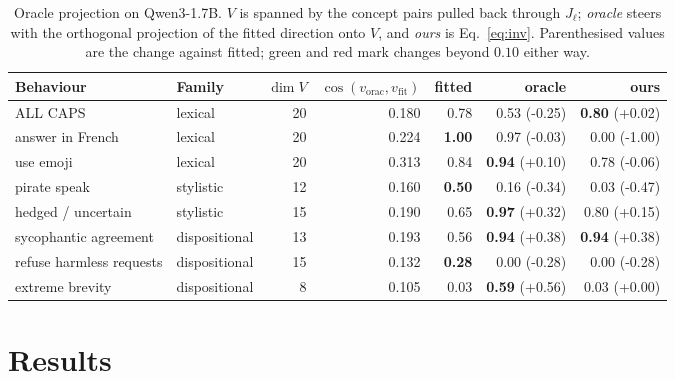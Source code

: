 \documentclass{article}
\newcommand{\pos}{\cellcolor{posgreen}}
\newcommand{\negc}{\cellcolor{negred}}
\newcommand{\dlt}[1]{{\scriptsize(#1)}}
\begin{document}
\begin{table}[t]
  \caption{Oracle projection on Qwen3-1.7B. $V$ is spanned by the concept pairs pulled back through $J_\ell$; \emph{oracle} steers with the orthogonal projection of the fitted direction onto $V$, and \emph{ours} is Eq.~\ref{eq:inv}. Parenthesised values are the change against fitted; \colorbox{posgreen}{green} and \colorbox{negred}{red} mark changes beyond $0.10$ either way.}
  \centering
  \small
  \begin{tabular}{llrrrrr}
    \toprule
    \textbf{Behaviour} & \textbf{Family} & $\dim V$ & $\cos(v_{\mathrm{orac}}, v_{\mathrm{fit}})$ & \textbf{fitted} & \textbf{oracle} & \textbf{ours} \\
    \midrule
    ALL CAPS                 & lexical       & 20 & 0.180 & 0.78          & \negc 0.53 \dlt{-0.25}          & \textbf{0.80} \dlt{+0.02} \\
    answer in French         & lexical       & 20 & 0.224 & \textbf{1.00} & 0.97 \dlt{-0.03}               & \negc 0.00 \dlt{-1.00} \\
    use emoji                & lexical       & 20 & 0.313 & 0.84          & \textbf{0.94} \dlt{+0.10}      & 0.78 \dlt{-0.06} \\
    pirate speak             & stylistic     & 12 & 0.160 & \textbf{0.50} & \negc 0.16 \dlt{-0.34}          & \negc 0.03 \dlt{-0.47} \\
    hedged / uncertain       & stylistic     & 15 & 0.190 & 0.65          & \pos \textbf{0.97} \dlt{+0.32} & \pos 0.80 \dlt{+0.15} \\
    sycophantic agreement    & dispositional & 13 & 0.193 & 0.56          & \pos \textbf{0.94} \dlt{+0.38} & \pos \textbf{0.94} \dlt{+0.38} \\
    refuse harmless requests & dispositional & 15 & 0.132 & \textbf{0.28} & \negc 0.00 \dlt{-0.28}          & \negc 0.00 \dlt{-0.28} \\
    extreme brevity          & dispositional &  8 & 0.105 & 0.03          & \pos \textbf{0.59} \dlt{+0.56} & 0.03 \dlt{+0.00} \\
    \bottomrule
  \end{tabular}
  \label{tab:oracle}
\end{table}

\section{Results}
\end{document}
